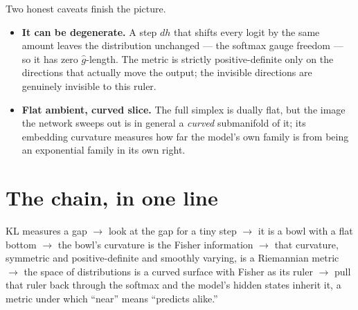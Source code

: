 \documentclass[11pt]{article}
\begin{document}
Two honest caveats finish the picture.
\begin{itemize}[leftmargin=1.4em]
  \item \textbf{It can be degenerate.} A step $dh$ that shifts every logit by the same amount
  leaves the distribution unchanged --- the softmax gauge freedom --- so it has zero
  $\hat g$-length. The metric is strictly positive-definite only on the directions that actually
  move the output; the invisible directions are genuinely invisible to this ruler.
  \item \textbf{Flat ambient, curved slice.} The full simplex is dually flat, but the image the
  network sweeps out is in general a \emph{curved} submanifold of it; its embedding curvature
  measures how far the model's own family is from being an exponential family in its own right.
\end{itemize}

\section{The chain, in one line}

\begin{summary}
KL measures a gap $\rightarrow$ look at the gap for a tiny step $\rightarrow$ it is a bowl with a
flat bottom $\rightarrow$ the bowl's curvature is the Fisher information $\rightarrow$ that
curvature, symmetric and positive-definite and smoothly varying, is a Riemannian metric
$\rightarrow$ the space of distributions is a curved surface with Fisher as its ruler
$\rightarrow$ pull that ruler back through the softmax and the model's hidden states inherit it,
a metric under which ``near'' means ``predicts alike.''
\end{summary}
\end{document}
